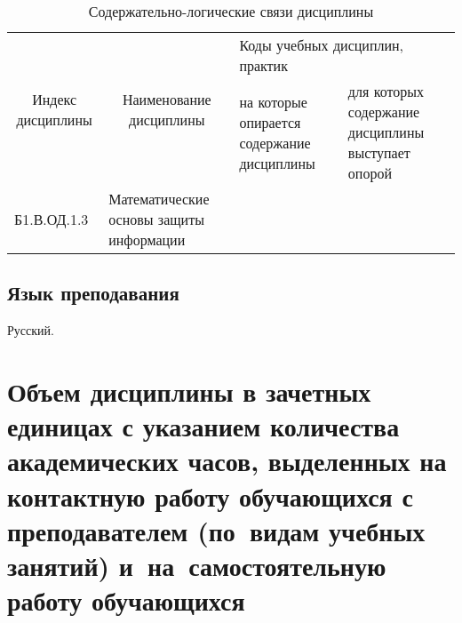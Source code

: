 \documentclass[a4paper,12pt]{article}
\begin{document}
  \begin{table}[H]
  \setlength\arraycolsep{3pt}
  \caption{Содержательно-логические связи дисциплины}
  \begin{tabular}{|l|p{18ex}|*{2}{p{23ex}|}}
  \hline
  \multicolumn{1}{|c|}{\multirow{2}{13ex}{\centering Индекс \linebreak дисциплины}} &
  \multicolumn{1}{c|}{\multirow{2}{18ex}{\centering Наименование \linebreak дисциплины}} & 
  \multicolumn{2}{p{46ex}|}{\centering Коды учебных дисциплин, практик} \\
  \cline{3-4}
   & & 
  \centering на которые опирается содержание дисциплины & 
  \centering\arraybackslash для которых содержание дисциплины выступает опорой
  \\ \hline
  Б1.В.ОД.1.3 & Математические основы защиты информации 
  & 
  
   
  & 
  
   
  \\ \hline
  \end{tabular}
  \end{table}


\subsection{Язык преподавания} 
  Русский.
  



\newpage

\section{Объем дисциплины в зачетных единицах с указанием количества академических часов, выделенных на контактную работу обучающихся с преподавателем (по~видам учебных занятий) и~на~самостоятельную работу обучающихся}
\end{document}
